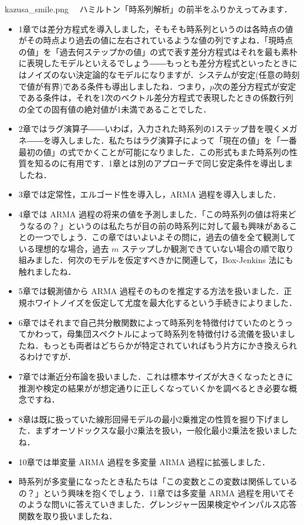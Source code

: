 \documentclass[b5paper,xelatex,ja=standard,10pt]{bxjsarticle}
\begin{document}
\begin{SERIFU}[colback=PaleIris,colbacktitle=PaleIris2]{kazusa_smile.png}
　ハミルトン「時系列解析」\cite{hamilton1994}の前半をふりかえってみます．
\vspace{-0.3\baselineskip}
\begin{itemize}
  \item 1章では差分方程式を導入しました，そもそも時系列というのは各時点の値がその時点より過去の値に左右されているような値の列ですよね．「現時点の値」を「過去何ステップかの値」の式で表す差分方程式はそれを最も素朴に表現したモデルといえるでしょう――もっとも差分方程式といったときにはノイズのない決定論的なモデルになりますが．システムが安定(任意の時刻で値が有界)である条件も導出しましたね．つまり，$p$次の差分方程式が安定である条件は，それを1次のベクトル差分方程式で表現したときの係数行列の全ての固有値の絶対値が1未満であることでした．
  \item 2章ではラグ演算子――いわば，入力された時系列の1ステップ昔を覗くメガネ――を導入しました．私たちはラグ演算子によって「現在の値」を「一番最初の値」の式でかくことが可能になりました．この形式もまた時系列の性質を知るのに有用です．1章とは別のアプローチで同じ安定条件を導出しましたね．
  \item 3章では定常性，エルゴード性を導入し，ARMA 過程を導入しました．
  \item 4章では ARMA 過程の将来の値を予測しました．{「この時系列の値は将来どうなるの？」}というのは私たちが目の前の時系列に対して最も興味があることの一つでしょう．この章ではいよいよその問に，過去の値を全て観測している理想的な場合，過去 $m$ ステップしか観測できていない場合の順で取り組みました．何次のモデルを仮定すべきかに関連して，Box-Jenkins 法にも触れましたね．
  \item 5章では観測値から ARMA 過程そのものを推定する方法を扱いました．正規ホワイトノイズを仮定して尤度を最大化するという手続きによりました．
  \item 6章ではそれまで自己共分散関数によって時系列を特徴付けていたのとうってかわって，母集団スペクトルによって時系列を特徴付ける流儀を扱いましたね．もっとも両者はどちらかが特定されていればもう片方にかき換えられるわけですが．
  \item 7章では漸近分布論を扱いました．これは標本サイズが大きくなったときに推測や検定の結果がが想定通りに正しくなっていくかを調べるとき必要な概念ですね．
  \item 8章は既に扱っていた線形回帰モデルの最小2乗推定の性質を掘り下げました．まずオーソドックスな最小2乗法を扱い，一般化最小2乗法を扱いましたね．
  \item 10章では単変量 ARMA 過程を多変量 ARMA 過程に拡張しました．
  \item 時系列が多変量になったとき私たちは{「この変数とこの変数は関係しているの？」}という興味を抱くでしょう．11章では多変量 ARMA 過程を用いてそのような問いに答えていきました．グレンジャー因果検定やインパルス応答関数を取り扱いましたね．
\end{itemize}
\end{SERIFU}
\end{document}
